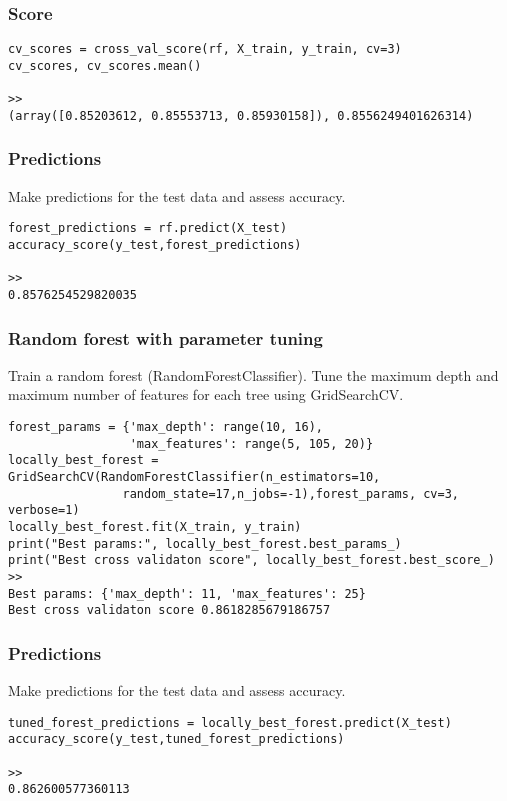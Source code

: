 \begin{frame}[fragile]\frametitle{Score}	
\begin{lstlisting}
cv_scores = cross_val_score(rf, X_train, y_train, cv=3)
cv_scores, cv_scores.mean()

>>
(array([0.85203612, 0.85553713, 0.85930158]), 0.8556249401626314)
\end{lstlisting}
\end{frame}

\begin{frame}[fragile]\frametitle{Predictions}	
Make predictions for the test data and assess accuracy.
\begin{lstlisting}
forest_predictions = rf.predict(X_test) 
accuracy_score(y_test,forest_predictions)

>>
0.8576254529820035
\end{lstlisting}
\end{frame}

\begin{frame}[fragile]\frametitle{Random forest with parameter tuning}	
Train a random forest (RandomForestClassifier). Tune the maximum depth and maximum number of features for each tree using GridSearchCV.
\begin{lstlisting}
forest_params = {'max_depth': range(10, 16),
                 'max_features': range(5, 105, 20)}
locally_best_forest = GridSearchCV(RandomForestClassifier(n_estimators=10, 
				random_state=17,n_jobs=-1),forest_params, cv=3, verbose=1)
locally_best_forest.fit(X_train, y_train)
print("Best params:", locally_best_forest.best_params_)
print("Best cross validaton score", locally_best_forest.best_score_)
>>
Best params: {'max_depth': 11, 'max_features': 25}
Best cross validaton score 0.8618285679186757
\end{lstlisting}
\end{frame}

\begin{frame}[fragile]\frametitle{Predictions}	
Make predictions for the test data and assess accuracy.
\begin{lstlisting}
tuned_forest_predictions = locally_best_forest.predict(X_test) 
accuracy_score(y_test,tuned_forest_predictions)

>>
0.862600577360113
\end{lstlisting}
\end{frame}